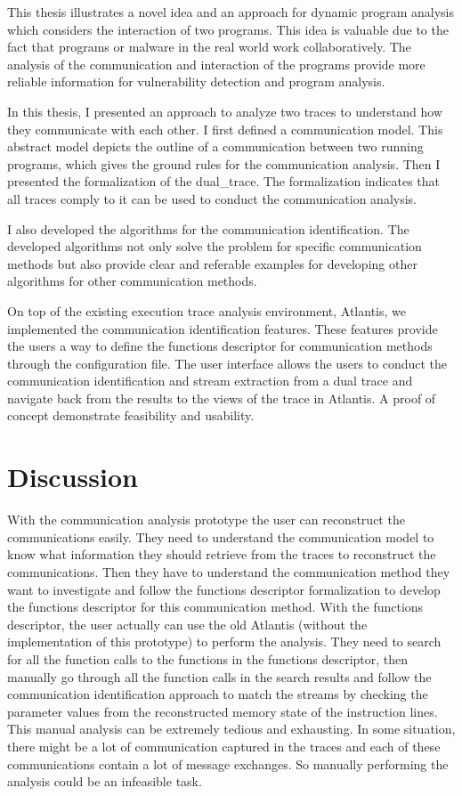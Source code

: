 \label{concl}
This thesis illustrates a novel idea and an approach for dynamic program analysis which considers the interaction of two programs. This idea is valuable due to the fact that programs or malware in the real world work collaboratively. The analysis of the communication and interaction of the programs provide more reliable information for vulnerability detection and program analysis.

In this thesis, I presented an approach to analyze two traces to understand how they communicate with each other. I first defined a communication model. This abstract model depicts the outline of a communication between two running programs, which gives the ground rules for the communication analysis. Then I presented the  formalization of the dual\_trace. The formalization indicates that all traces comply to it can be used to conduct the communication analysis.

I also developed the algorithms for the communication identification. The developed algorithms not only solve the problem for specific communication methods but also provide clear and referable examples for developing other algorithms for other communication methods.

On top of the existing execution trace analysis environment, Atlantis, we implemented the communication identification features. These features provide the users a way to define the functions descriptor for communication methods through the configuration file. The user interface allows the users to conduct the communication identification and stream extraction from a dual trace and navigate back from the results to the views of the trace in Atlantis.  A proof of concept demonstrate feasibility and usability. 

\section{Discussion}
With the communication analysis prototype the user can reconstruct the communications easily. They need to understand the communication model to know what information they should retrieve from the traces to reconstruct the communications. Then they have to understand the communication method they want to investigate and follow the functions descriptor formalization to develop the functions descriptor for this communication method. With the functions descriptor, the user actually can use the old Atlantis (without the implementation of this prototype) to perform the analysis. They need to search for all the function calls to the functions in the functions descriptor, then manually go through all the function calls in the search results and follow the communication identification approach to match the streams by checking the parameter values from the reconstructed memory state of the instruction lines. This manual analysis can be extremely tedious and exhausting. In some situation, there might be a lot of communication captured in the traces and each of these communications contain a lot of message exchanges. So manually performing the analysis could be an infeasible task.

